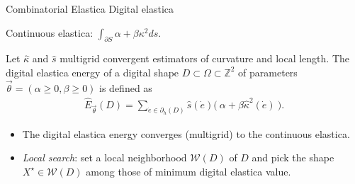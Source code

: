 \begin{frame}
	{Combinatorial Elastica}	
	{Digital elastica}

Continuous elastica:\hspace{1em} $\displaystyle \int_{\partial S}{ \alpha + \beta \kappa ^2ds}.$

%	
		\begin{definition}
		Let $\hat{\kappa}$ and $\hat{s}$ multigrid convergent estimators of curvature and local length. The digital elastica energy of a digital shape $D \subset \Omega \subset \mathbb{Z}^2$ of parameters $\vec{\theta} = (\alpha \geq 0, \beta \geq 0)$ is defined as
%		
		\begin{align*}
			\hat{E}_{\vec{\theta}}(D) = \sum_{\dot{e} \in \partial_h(D)}{\hat{s}(\dot{e}) \Big(\: \alpha + \beta \hat{\kappa}^2(\dot{e}) \: \Big). }
		\end{align*}
	\end{definition}
%	
	\begin{itemize}
		\item<2->{The digital elastica energy converges (multigrid) to the continuous elastica.}\\[2em]
		\item<3->{\emph{Local search}: set a local neighborhood $\mathcal{W}(D)$ of $D$ and pick the shape $X^{\star} \in \mathcal{W}(D)$ among those of minimum digital elastica value.}
	\end{itemize}
\end{frame}
%
%
%
%
% 
